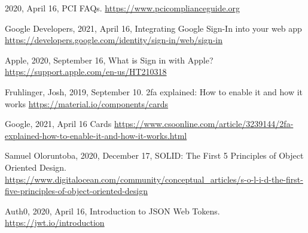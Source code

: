 \begin{thebibliography}{9} 
    2020, April 16,
    PCI FAQs.
    \url{https://www.pcicomplianceguide.org}

    Google Developers,
    2021, April 16,
    Integrating Google Sign-In into your web app
    \url{https://developers.google.com/identity/sign-in/web/sign-in}

    Apple,
    2020, September 16,
    What is Sign in with Apple?
    \url{https://support.apple.com/en-us/HT210318}

    Fruhlinger, Josh,
    2019, September 10.
    2fa explained: How to enable it and how it works
    \url{https://material.io/components/cards}

    Google,
    2021, April 16 
    Cards
    \url{https://www.csoonline.com/article/3239144/2fa-explained-how-to-enable-it-and-how-it-works.html}

    Samuel Oloruntoba,
    2020, December 17,
    SOLID: The First 5 Principles of Object Oriented Design.
    \url{https://www.digitalocean.com/community/conceptual_articles/s-o-l-i-d-the-first-five-principles-of-object-oriented-design}

    Auth0,
    2020, April 16,
    Introduction to JSON Web Tokens.
    \url{https://jwt.io/introduction}
\end{thebibliography}
